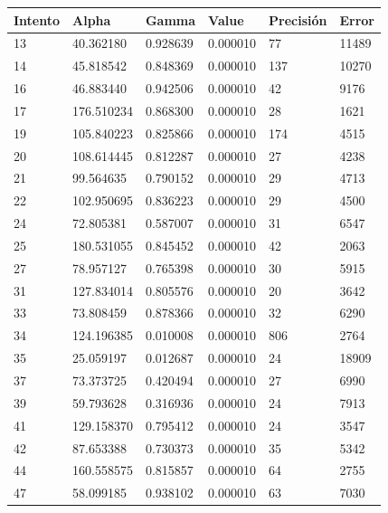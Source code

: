 \begin{tabular}{llllll}
\toprule
Intento & Alpha & Gamma & Value & Precisión & Error \\
\midrule
13 & 40.362180 & 0.928639 & 0.000010 & 77 & 11489 \\
14 & 45.818542 & 0.848369 & 0.000010 & 137 & 10270 \\
16 & 46.883440 & 0.942506 & 0.000010 & 42 & 9176 \\
17 & 176.510234 & 0.868300 & 0.000010 & 28 & 1621 \\
19 & 105.840223 & 0.825866 & 0.000010 & 174 & 4515 \\
20 & 108.614445 & 0.812287 & 0.000010 & 27 & 4238 \\
21 & 99.564635 & 0.790152 & 0.000010 & 29 & 4713 \\
22 & 102.950695 & 0.836223 & 0.000010 & 29 & 4500 \\
24 & 72.805381 & 0.587007 & 0.000010 & 31 & 6547 \\
25 & 180.531055 & 0.845452 & 0.000010 & 42 & 2063 \\
27 & 78.957127 & 0.765398 & 0.000010 & 30 & 5915 \\
31 & 127.834014 & 0.805576 & 0.000010 & 20 & 3642 \\
33 & 73.808459 & 0.878366 & 0.000010 & 32 & 6290 \\
34 & 124.196385 & 0.010008 & 0.000010 & 806 & 2764 \\
35 & 25.059197 & 0.012687 & 0.000010 & 24 & 18909 \\
37 & 73.373725 & 0.420494 & 0.000010 & 27 & 6990 \\
39 & 59.793628 & 0.316936 & 0.000010 & 24 & 7913 \\
41 & 129.158370 & 0.795412 & 0.000010 & 24 & 3547 \\
42 & 87.653388 & 0.730373 & 0.000010 & 35 & 5342 \\
44 & 160.558575 & 0.815857 & 0.000010 & 64 & 2755 \\
47 & 58.099185 & 0.938102 & 0.000010 & 63 & 7030 \\
\bottomrule
\end{tabular}
